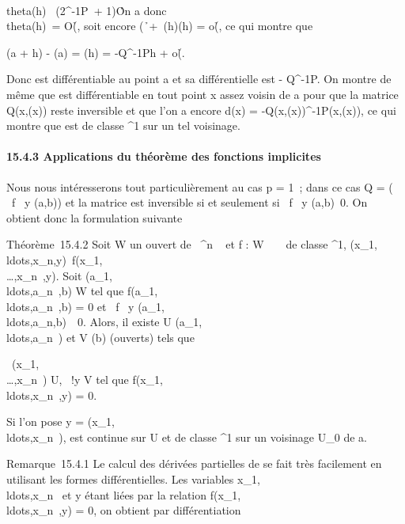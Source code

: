 \documentclass[]{article}
\begin{document}
\\theta(h)\ \leq
(2\Q^-1P\ +
1)\h\.

On a donc \\theta(h)\ =
O(\h\), soit encore
(\h\
+\ \theta(h)\)\eta(h) =
o(\h\), ce qui montre
que

\phi(a + h) - \phi(a) = \theta(h) = -Q^-1Ph +
o(\h\).

Donc \phi est différentiable au point a et sa différentielle est -
Q^-1P. On montre de même que \phi est différentiable en tout
point x assez voisin de a pour que la matrice Q(x,\phi(x)) reste inversible
et que l'on a encore d\phi(x) = -Q(x,\phi(x))^-1P(x,\phi(x)), ce qui
montre que \phi est de classe \mathcal{C}^1 sur un tel voisinage.

\paragraph{15.4.3 Applications du théorème des fonctions implicites}

Nous nous intéresserons tout particulièrement au cas p = 1~; dans ce cas
Q = \left (\matrix\, \partial~f
\over \partial~y (a,b)\right ) et la matrice
est inversible si et seulement si  \partial~f \over \partial~y
(a,b)\neq~0. On obtient donc la formulation
suivante

Théorème~15.4.2 Soit W un ouvert de ~^n \times {}~ et f : W \rightarrow~ ~ de
classe \mathcal{C}^1,
(x_1,\\ldots,x_n,y)\mapsto~f(x_1,\\\ldots,x_n~,y).
Soit
(a_1,\\ldots,a_n~,b)
\in W tel que
f(a_1,\\ldots,a_n~,b)
= 0 et  \partial~f \over \partial~y
(a_1,\\ldots,a_n,b)\mathrel\neq~~0.
Alors, il existe U
\inV(a_1,\\ldots,a_n~)
et V \inV(b) (ouverts) tels que

\forall~(x_1,\\\ldots,x_n~)
\in U, \exists~!y \in V \text tel que
f(x_1,\\ldots,x_n~,y)
= 0.

Si l'on pose y =
\phi(x_1,\\ldots,x_n~),
\phi est continue sur U et de classe ^1 sur un voisinage
U_0 de a.

Remarque~15.4.1 Le calcul des dérivées partielles de \phi se fait très
facilement en utilisant les formes différentielles. Les variables
x_1,\\ldots,x_n~
et y étant liées par la relation
f(x_1,\\ldots,x_n~,y)
= 0, on obtient par différentiation
\end{document}
